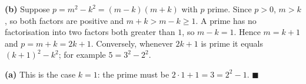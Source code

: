 \textbf{(b)} Suppose $p=m^2-k^2=(m-k)(m+k)$ with $p$ prime. Since $p>0$, $m>k$, so both factors are positive and $m+k>m-k\ge1$. A prime has no factorisation into two factors both greater than $1$, so $m-k=1$. Hence $m=k+1$ and $p=m+k=2k+1$. Conversely, whenever $2k+1$ is prime it equals $(k+1)^2-k^2$; for example $5=3^2-2^2$.

\textbf{(a)} This is the case $k=1$: the prime must be $2\cdot1+1=3=2^2-1$. $\blacksquare$
